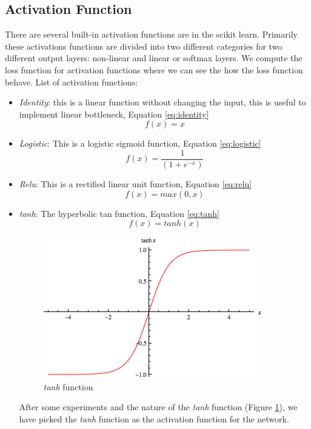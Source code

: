 \subsection{Activation Function}
There are several built-in activation functions are in the scikit learn. Primarily these activations functions are divided into two different categories for two different output layers: non-linear and linear or softmax layers.  We compute the loss function for activation functions where we can see the how the loss function behave. List of activation functions:

\begin{itemize}
\item \emph{Identity}: this is a linear function without changing the input, this is useful to implement linear bottleneck, Equation \ref{eq:identity}
\begin{equation}
f(x) = x
\label{eq:identity}
\end{equation}

\item \emph{Logistic}: This is a logistic sigmoid function, Equation \ref{eq:logistic}
\begin{equation}
f(x) = \frac{1}{(1+e^{-x})}
\label{eq:logistic}
\end{equation}

\item \emph{Relu}: This is a rectified linear unit function, Equation  \ref{eq:relu}
\begin{equation}
f(x) = max(0, x)
\label{eq:relu}
\end{equation}

\item \emph{tanh}: The hyperbolic tan function, Equation  \ref{eq:tanh}
\begin{equation}
f(x) = tanh(x)
\label{eq:tanh}
\end{equation}

 
\begin{figure}[!h]
\begin{center}
        \includegraphics[width=0.3\textheight]{img/tanh.png}
        \caption{\emph{tanh} function}  \label{fig:tanh}
\end{center}
\end{figure}

After some experiments and the nature of the \emph{tanh} function (Figure \ref{fig:tanh}), we have picked the \emph{tanh} function as the activation function for the network.

\end{itemize}


